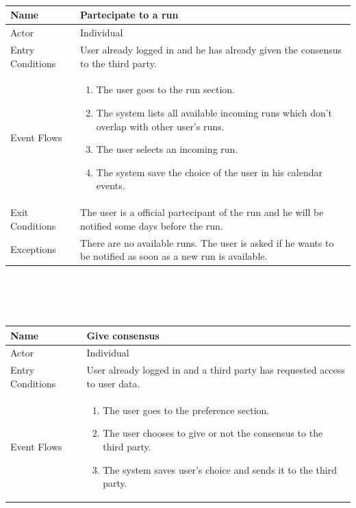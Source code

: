 \documentclass{article}
\begin{document}
\begin{legal}
\begin{legal}
\begin{legal}
\begin{tabular}{| m{3.5cm} | m{8cm}| }
				\hline
				\end{tabular}
				\\\\\\
				\begin{tabular}{| m{3.5cm} | m{8cm}| }
				\hline
					Name & Partecipate to a run\\
				\hline
					Actor & Individual\\
				\hline
					Entry Conditions & User already logged in and he has already given the consensus to the third party.\\
				\hline
					Event Flows & \begin{enumerate}
									\item The user goes to the run section.
									\item The system lists all available incoming runs which don't overlap with other user's runs.
									\item The user selects an incoming run.
									\item The system save the choice of the user in his calendar events.
				\end{enumerate}\\
				\hline
					Exit Conditions & The user is a official partecipant of the run and he will be notified some days before the run.\\
				\hline
					Exceptions & There are no available runs. The user is asked if he wants to be notified as soon as a new run is available.\\
				\hline
				\end{tabular}
				\\\\\\
				\begin{tabular}{| m{3.5cm} | m{8cm}| }
				\hline
					Name & Give consensus\\
				\hline
					Actor & Individual\\
				\hline
					Entry Conditions & User already logged in and a third party has requested access to user data.\\
				\hline
					Event Flows & \begin{enumerate}
									\item The user goes to the preference section.
									\item The user chooses to give or not the consensus to the third party.
									\item The system saves user's choice and sends it to the third party.

\end{enumerate}
\end{tabular}
\end{legal}
\end{legal}
\end{legal}
\end{document}
